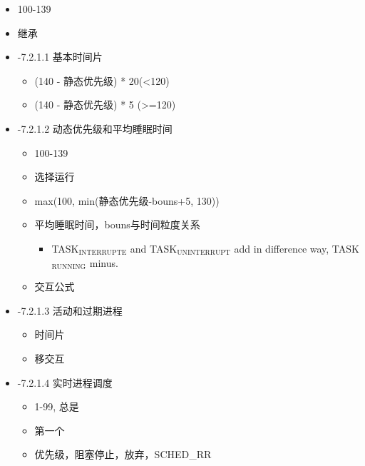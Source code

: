\documentclass[11pt]{article}
\begin{document}
\begin{itemize}
\item 100-139
\item 继承
\end{itemize}
\begin{itemize}

\item -7.2.1.1 基本时间片\\
\label{sec-2.2.1.1}

\begin{itemize}
\item (140 - 静态优先级) * 20(<120)
\item (140 - 静态优先级) * 5 (>=120)
\end{itemize}

\item -7.2.1.2 动态优先级和平均睡眠时间\\
\label{sec-2.2.1.2}

\begin{itemize}
\item 100-139
\item 选择运行
\item max(100, min(静态优先级-bouns+5, 130))
\item 平均睡眠时间，bouns与时间粒度关系

\begin{itemize}
\item TASK$_{\mathrm{INTERRUPTE}}$ and TASK$_{\mathrm{UNINTERRUPT}}$ add in difference way, TASK$_{\mathrm{RUNNING}}$
    minus.
\end{itemize}

\item 交互公式
\end{itemize}

\item -7.2.1.3 活动和过期进程\\
\label{sec-2.2.1.3}

\begin{itemize}
\item 时间片
\item 移交互
\end{itemize}

\item -7.2.1.4 实时进程调度\\
\label{sec-2.2.1.4}

\begin{itemize}
\item 1-99, 总是
\item 第一个
\item 优先级，阻塞停止，放弃，SCHED\_RR
\end{itemize}
\end{itemize} %
\end{document}
